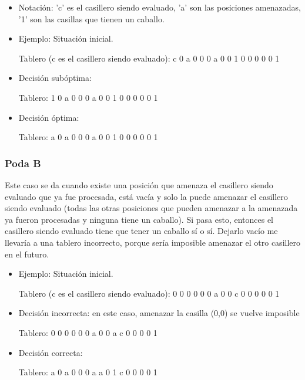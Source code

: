 \begin{itemize}
\item Notación: 'c' es el casillero siendo evaluado, 'a' son las posiciones amenazadas, '1' son las casillas que tienen un caballo.

\item Ejemplo: Situación inicial.

\begin{codesnippet}
Tablero (c es el casillero siendo evaluado):
c 0 a 0
0 0 a 0
0 1 0 0
0 0 0 1
\end{codesnippet}

\item Decisión subóptima:

\begin{codesnippet}
Tablero:
1 0 a 0
0 0 a 0
0 1 0 0
0 0 0 1
\end{codesnippet}

\item Decisión óptima:

\begin{codesnippet}
Tablero:
a 0 a 0
0 0 a 0
0 1 0 0
0 0 0 1
\end{codesnippet}
\end{itemize}

\subsubsection{Poda B}
Este caso se da cuando existe una posición que amenaza el casillero siendo evaluado que ya fue procesada, está vacía y solo la puede amenazar el casillero siendo evaluado (todas las otras posiciones que pueden amenazar a la amenazada ya fueron procesadas y ninguna tiene un caballo).
Si pasa esto, entonces el casillero siendo evaluado tiene que tener un caballo sí o sí. Dejarlo vacío me llevaría a una tablero incorrecto, porque sería imposible amenazar el otro casillero en el futuro.

\begin{itemize}
\item Ejemplo: Situación inicial.

\begin{codesnippet}
Tablero (c es el casillero siendo evaluado):
0 0 0 0
0 0 a 0
0 c 0 0
0 0 0 1
\end{codesnippet}

\item Decisión incorrecta:
en este caso, amenazar la casilla (0,0) se vuelve imposible

\begin{codesnippet}
Tablero:
0 0 0 0
0 0 a 0
0 a c 0
0 0 0 1
\end{codesnippet}

\item Decisión correcta:

\begin{codesnippet}
Tablero:
a 0 a 0
0 0 a a
0 1 c 0
0 0 0 1
\end{codesnippet}
\end{itemize}

